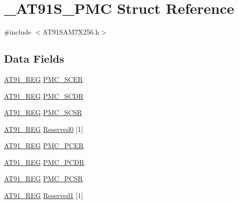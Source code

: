 \hypertarget{struct__AT91S__PMC}{\section{\-\_\-\-A\-T91\-S\-\_\-\-P\-M\-C Struct Reference}
\label{struct__AT91S__PMC}
}


{\ttfamily \#include $<$A\-T91\-S\-A\-M7\-X256.\-h$>$}

\subsection*{Data Fields}
\begin{DoxyCompactItemize}
\item 
\hyperlink{GCC_2ARM7__AT91SAM7S_2AT91SAM7X256_8h_a712ad5a1ac1bd02f3e95a7526c283ce1}{A\-T91\-\_\-\-R\-E\-G} \hyperlink{struct__AT91S__PMC_a8b9d2ec1773c1ab2ba294d722fc44c00}{P\-M\-C\-\_\-\-S\-C\-E\-R}
\item 
\hyperlink{GCC_2ARM7__AT91SAM7S_2AT91SAM7X256_8h_a712ad5a1ac1bd02f3e95a7526c283ce1}{A\-T91\-\_\-\-R\-E\-G} \hyperlink{struct__AT91S__PMC_a528dd78ce6aa4cc56026e2dc7380282d}{P\-M\-C\-\_\-\-S\-C\-D\-R}
\item 
\hyperlink{GCC_2ARM7__AT91SAM7S_2AT91SAM7X256_8h_a712ad5a1ac1bd02f3e95a7526c283ce1}{A\-T91\-\_\-\-R\-E\-G} \hyperlink{struct__AT91S__PMC_ab55c9303c8ea02641dc24182c544139e}{P\-M\-C\-\_\-\-S\-C\-S\-R}
\item 
\hyperlink{GCC_2ARM7__AT91SAM7S_2AT91SAM7X256_8h_a712ad5a1ac1bd02f3e95a7526c283ce1}{A\-T91\-\_\-\-R\-E\-G} \hyperlink{struct__AT91S__PMC_aae3bfa4a88c29f53b43ad4d6fde4b6ee}{Reserved0} \mbox{[}1\mbox{]}
\item 
\hyperlink{GCC_2ARM7__AT91SAM7S_2AT91SAM7X256_8h_a712ad5a1ac1bd02f3e95a7526c283ce1}{A\-T91\-\_\-\-R\-E\-G} \hyperlink{struct__AT91S__PMC_abfc7e835740e173465ff67a5957cd371}{P\-M\-C\-\_\-\-P\-C\-E\-R}
\item 
\hyperlink{GCC_2ARM7__AT91SAM7S_2AT91SAM7X256_8h_a712ad5a1ac1bd02f3e95a7526c283ce1}{A\-T91\-\_\-\-R\-E\-G} \hyperlink{struct__AT91S__PMC_a2c995bed4a6b1c2fbae4abbc51e63dae}{P\-M\-C\-\_\-\-P\-C\-D\-R}
\item 
\hyperlink{GCC_2ARM7__AT91SAM7S_2AT91SAM7X256_8h_a712ad5a1ac1bd02f3e95a7526c283ce1}{A\-T91\-\_\-\-R\-E\-G} \hyperlink{struct__AT91S__PMC_a3ba02e62e84225fae0f948a38753c027}{P\-M\-C\-\_\-\-P\-C\-S\-R}
\item 
\hyperlink{GCC_2ARM7__AT91SAM7S_2AT91SAM7X256_8h_a712ad5a1ac1bd02f3e95a7526c283ce1}{A\-T91\-\_\-\-R\-E\-G} \hyperlink{struct__AT91S__PMC_ac82dc0a86cbd07091bbd7a385dde5c16}{Reserved1} \mbox{[}1\mbox{]}

\end{DoxyCompactItemize}
